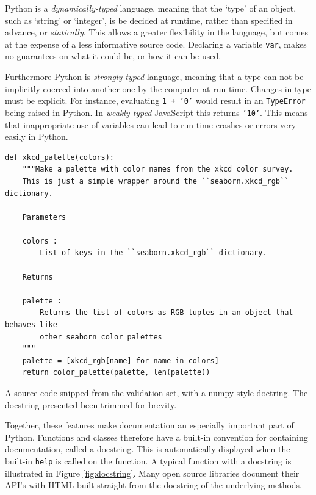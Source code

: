 Python is a \textit{dynamically-typed} language, meaning that the `type' of an object, such as `string' or `integer', is be decided at runtime, rather than specified in advance, or \textit{statically}.
This allows a greater flexibility in the language, but comes at the expense of a less informative source code.
Declaring a variable \texttt{var}, makes no guarantees on what it could be, or how it can be used. 

Furthermore Python is \textit{strongly-typed} language, meaning that a type can not be implicitly coerced into another one by the computer at run time. Changes in type must be explicit. For instance, evaluating \texttt{1 + '0'} would result in an \texttt{TypeError} being raised in Python. In \textit{weakly-typed} JavaScript this returns \texttt{'10'}.
This means that inappropriate use of variables can lead to run time crashes or errors very easily in Python.

\begin{listing}[h!] 

\begin{verbatim}
def xkcd_palette(colors):
    """Make a palette with color names from the xkcd color survey.
    This is just a simple wrapper around the ``seaborn.xkcd_rgb`` dictionary.

    Parameters
    ----------
    colors : 
        List of keys in the ``seaborn.xkcd_rgb`` dictionary.

    Returns
    -------
    palette : 
        Returns the list of colors as RGB tuples in an object that behaves like
        other seaborn color palettes
    """
    palette = [xkcd_rgb[name] for name in colors]
    return color_palette(palette, len(palette))

\end{verbatim}

    \caption{A source code snipped from the validation set, with  a numpy-style doctring. The docstring presented been trimmed for brevity.}
    \label{fig:docstring}
\end{listing}




Together, these features make documentation an especially important part of Python. 
Functions and classes therefore have a built-in convention for containing documentation, called a docstring. 
This is automatically displayed when the built-in \texttt{help} is called on the function.
A typical function with a docstring is illustrated in Figure \ref{fig:docstring}. 
Many open source libraries document their API's with HTML built straight from the docstring of the underlying methods.

